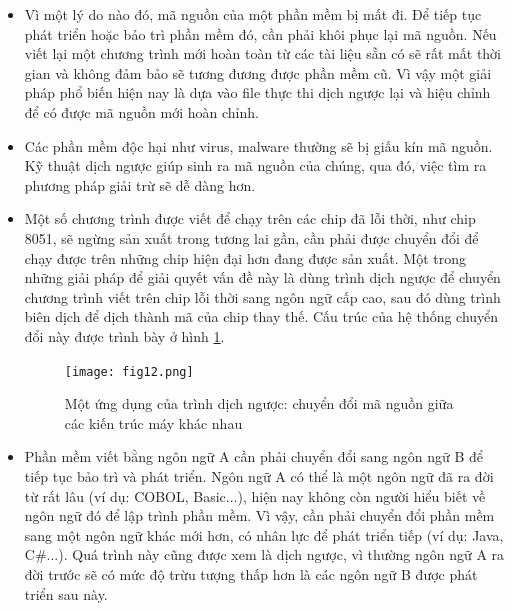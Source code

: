 \begin{itemize}
	\item Vì một lý do nào đó, mã nguồn của một phần mềm bị mất đi. Để tiếp tục phát triển hoặc bảo trì phần mềm đó, cần phải khôi phục lại mã nguồn. Nếu viết lại một chương trình mới hoàn toàn từ các tài liệu sẵn có sẽ rất mất thời gian và không đảm bảo sẽ tương đương được phần mềm cũ. Vì vậy một giải pháp phổ biến hiện nay là dựa vào file thực thi dịch ngược lại và hiệu chỉnh để có được mã nguồn mới hoàn chỉnh.
	\item Các phần mềm độc hại như virus, malware thường sẽ bị giấu kín mã nguồn. Kỹ thuật dịch ngược giúp sinh ra mã nguồn của chúng, qua đó, việc tìm ra phương pháp giải trừ sẽ dễ dàng hơn.
	\item Một số chương trình được viết để chạy trên các chip đã lỗi thời, như chip 8051, sẽ ngừng sản xuất trong tương lai gần, cần phải được chuyển đổi để chạy được trên những chip hiện đại hơn đang được sản xuất. Một trong những giải pháp để giải quyết vấn đề này là dùng trình dịch ngược để chuyển chương trình viết trên chip lỗi thời sang ngôn ngữ cấp cao, sau đó dùng trình biên dịch để dịch thành mã của chip thay thế. Cấu trúc của hệ thống chuyển đổi này được trình bày ở hình \ref{fig:fig12}.
	
	\begin{figure}[h]
		\centering
		\texttt{[image: fig12.png]}
		\caption{Một ứng dụng của trình dịch ngược: chuyển đổi mã nguồn giữa các kiến trúc máy khác nhau}
		\label{fig:fig12}
	\end{figure}
	\item Phần mềm viết bằng ngôn ngữ A cần phải chuyển đổi sang ngôn ngữ B để tiếp tục bảo trì và phát triển. Ngôn ngữ A có thể là một ngôn ngữ đã ra đời từ rất lâu (ví dụ: COBOL, Basic...), hiện nay không còn người hiểu biết về ngôn ngữ đó để lập trình phần mềm. Vì vậy, cần phải chuyển đổi phần mềm sang một ngôn ngữ khác mới hơn, có nhân lực để phát triển tiếp (ví dụ: Java, C\#...). Quá trình này cũng được xem là dịch ngược, vì thường ngôn ngữ A ra đời trước sẽ có mức độ trừu tượng thấp hơn là các ngôn ngữ B được phát triển sau này.
\end{itemize}

